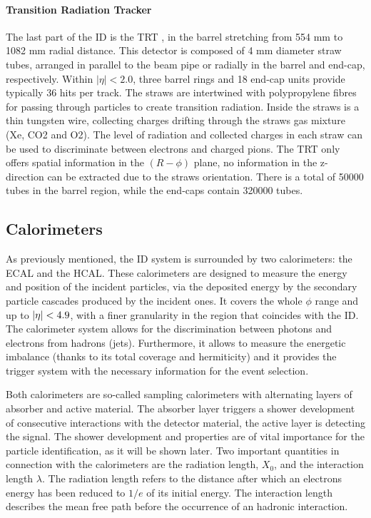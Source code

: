 \paragraph{Transition Radiation Tracker}
The last part of the \ac{ID} is the \ac{TRT} \cite{TRTDesignPerformance}, in the barrel stretching from 554 mm to 1082 mm radial distance.  This detector is composed of 4 mm diameter straw tubes,  arranged in parallel to the beam pipe or radially in the barrel and end-cap, respectively.  Within $|\eta| < 2.0$,  three barrel rings and 18 end-cap units provide typically 36 hits per track. The straws are intertwined with polypropylene fibres for passing through particles to create transition radiation.  Inside the straws is a thin tungsten wire,  collecting charges drifting through the straws gas mixture (Xe, CO2 and O2). The level of radiation and collected charges in each straw can be used to discriminate between electrons and charged pions.  The \ac{TRT} only offers spatial information in the $(R-\phi)$ plane, no information in the z-direction can be extracted due to the straws orientation. There is a total of 50000 tubes in the barrel region, while the end-caps contain 320000 tubes.








\subsection{Calorimeters}

As previously mentioned, the \ac{ID} system is surrounded by two calorimeters: the \ac{ECAL} and the \ac{HCAL}. These calorimeters are designed to measure the energy and position of the incident particles, via the deposited energy by the secondary particle cascades produced by the incident ones. It covers the whole \(\phi\) range and up to \(|\eta|<4.9\), with a finer granularity in the region that coincides with the \ac{ID}.
The calorimeter system allows for the discrimination between photons and electrons from hadrons (jets). Furthermore, it allows to measure the energetic imbalance (thanks to its total coverage and hermiticity) and it provides the trigger system with the necessary information for the event selection.

Both calorimeters are so-called sampling calorimeters with alternating layers of absorber and active material. The absorber layer triggers a shower development of consecutive interactions with the detector material, the active layer is detecting the signal.
The shower development and properties are of vital importance for the particle identification, as it will be shown later.
Two important quantities in connection with the calorimeters are the radiation length, $X_0$, and the interaction length $\lambda$. The radiation length refers to the distance after which an electrons energy has been reduced to \(1/e\) of its initial energy. The interaction length describes the mean free path before the occurrence of an hadronic interaction.

